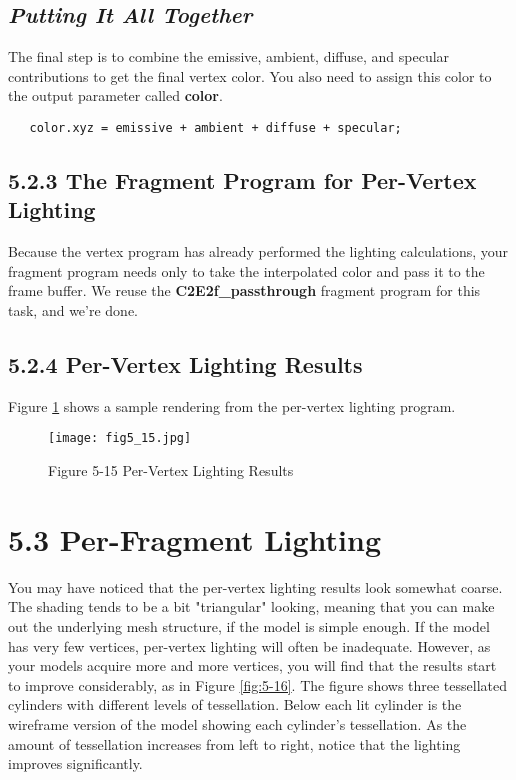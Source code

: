\documentclass[../main.tex]{subfiles}
\begin{document}
\subsection*{\textit{Putting It All Together}}

The final step is to combine the emissive, ambient, diffuse, and specular contributions to get the final vertex color. You also need to assign this color to the output parameter called \textbf{color}.

\FloatBarrier
\begin{lstlisting}
   color.xyz = emissive + ambient + diffuse + specular;
\end{lstlisting}
\FloatBarrier

\subsection{5.2.3 The Fragment Program for Per-Vertex Lighting}

Because the vertex program has already performed the lighting calculations, your fragment program needs only to take the interpolated color and pass it to the frame buffer. We reuse the \textbf{C2E2f_passthrough} fragment program for this task, and we're done.

\subsection{5.2.4 Per-Vertex Lighting Results}

Figure \ref{fig:5-15} shows a sample rendering from the per-vertex lighting program.

\begin{figure}
    \centering
    \texttt{[image: fig5\_15.jpg]}
    \caption{Figure 5-15 Per-Vertex Lighting Results}
    \label{fig:5-15}
\end{figure}

\section{5.3 Per-Fragment Lighting}

You may have noticed that the per-vertex lighting results look somewhat coarse. The shading tends to be a bit "triangular" looking, meaning that you can make out the underlying mesh structure, if the model is simple enough. If the model has very few vertices, per-vertex lighting will often be inadequate. However, as your models acquire more and more vertices, you will find that the results start to improve considerably, as in Figure \ref{fig:5-16}. The figure shows three tessellated cylinders with different levels of tessellation. Below each lit cylinder is the wireframe version of the model showing each cylinder's tessellation. As the amount of tessellation increases from left to right, notice that the lighting improves significantly.
\end{document}
